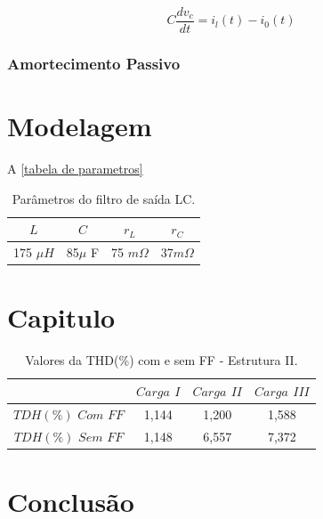 \documentclass[
  12pt,       	%
  openright,    %
  oneside,      %
  a4paper,      %
  chapter=Title,   %
  section=Title,   %
  subsection=Title,  %
  subsubsection=Title,%
  english,      %
  french,        %
  spanish,     %
  brazil        %
  ]{abntex2-deelt-v1}
\begin{document}
\begin{equation}\label{Eq. 5}
	C\frac{dv_c}{dt} = i_l(t) - i_0(t)
\end{equation}
\subsection{Amortecimento Passivo}

\chapter{Modelagem}
\par

A \autoref{tabela de parametros}
\begin{table}[!htb]
	\centering
	\caption{Parâmetros do filtro de saída LC.}
	\label{tabela de parametros}
	\begin{tabular}{|c|c|c|c|} 
		\hline
		$L$ & $C$ & $r_{L} $ &  $r_{C} $ \\
		\hline                               
		 175 $\mu H$ & 85$\mu$ F & 75 $m\Omega$ & 37$m\Omega$ \\
		\hline
	\end{tabular}
\end{table}

\chapter{ Capitulo}
\par


\begin{table}[!htb]
	\centering
	\caption{Valores da THD(\%) com e sem FF - Estrutura II.}
	\label{tab8}
	\begin{tabular}{c|c|c|c} 
									& $Carga$ $I$ 	  & $Carga$ $II$ 	& $Carga$ $III$  \\
		\hline                               
		$TDH(\%)$ $Com$ $FF$		& 1,144     	  &  1,200			&	1,588	 \\
		\hline    
		$TDH(\%)$ $Sem$ $FF$ 		& 1,148  	  	  &  6,557		&	7,372	  \\
	\end{tabular}
\end{table}


\chapter{Conclusão}
\par
\end{document}
